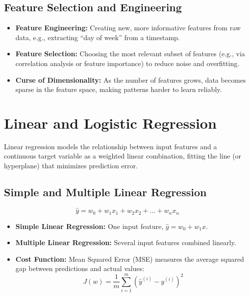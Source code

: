 \documentclass[11pt,a4paper]{article}
\begin{document}
\subsection{Feature Selection and Engineering}
\begin{itemize}[leftmargin=*]
  \item \textbf{Feature Engineering:} Creating new, more informative features from raw data, e.g., extracting ``day of week'' from a timestamp.
  \item \textbf{Feature Selection:} Choosing the most relevant subset of features (e.g., via correlation analysis or feature importance) to reduce noise and overfitting.
  \item \textbf{Curse of Dimensionality:} As the number of features grows, data becomes sparse in the feature space, making patterns harder to learn reliably.
\end{itemize}

\section{Linear and Logistic Regression}

\begin{definitionbox}
Linear regression models the relationship between input features and a continuous target variable as a weighted linear combination, fitting the line (or hyperplane) that minimizes prediction error.
\end{definitionbox}

\subsection{Simple and Multiple Linear Regression}
$$
\hat{y} = w_0 + w_1 x_1 + w_2 x_2 + \dots + w_n x_n
$$
\begin{itemize}[leftmargin=*]
  \item \textbf{Simple Linear Regression:} One input feature, $\hat{y} = w_0 + w_1 x$.
  \item \textbf{Multiple Linear Regression:} Several input features combined linearly.
  \item \textbf{Cost Function:} Mean Squared Error (MSE) measures the average squared gap between predictions and actual values:
  $$
  J(w) = \frac{1}{m}\sum_{i=1}^{m}\left(\hat{y}^{(i)} - y^{(i)}\right)^2
  $$
\end{itemize}
\end{document}
